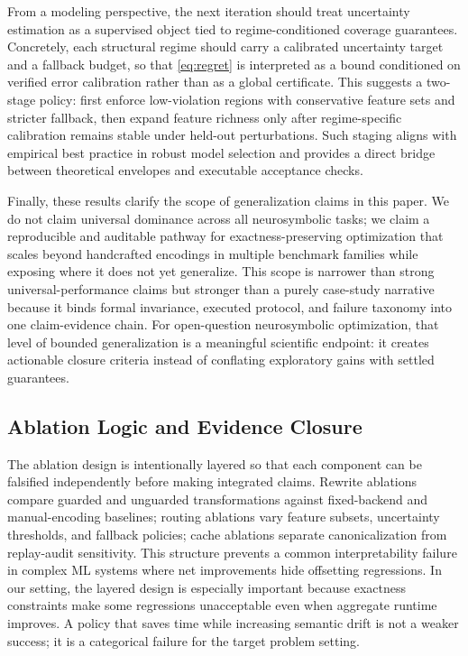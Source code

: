 \documentclass{article} %
\begin{document}
From a modeling perspective, the next iteration should treat uncertainty estimation as a supervised object tied to regime-conditioned coverage guarantees. Concretely, each structural regime should carry a calibrated uncertainty target and a fallback budget, so that \eqref{eq:regret} is interpreted as a bound conditioned on verified error calibration rather than as a global certificate. This suggests a two-stage policy: first enforce low-violation regions with conservative feature sets and stricter fallback, then expand feature richness only after regime-specific calibration remains stable under held-out perturbations. Such staging aligns with empirical best practice in robust model selection and provides a direct bridge between theoretical envelopes and executable acceptance checks.

Finally, these results clarify the scope of generalization claims in this paper. We do not claim universal dominance across all neurosymbolic tasks; we claim a reproducible and auditable pathway for exactness-preserving optimization that scales beyond handcrafted encodings in multiple benchmark families while exposing where it does not yet generalize. This scope is narrower than strong universal-performance claims but stronger than a purely case-study narrative because it binds formal invariance, executed protocol, and failure taxonomy into one claim-evidence chain. For open-question neurosymbolic optimization, that level of bounded generalization is a meaningful scientific endpoint: it creates actionable closure criteria instead of conflating exploratory gains with settled guarantees.

\subsection{Ablation Logic and Evidence Closure}
The ablation design is intentionally layered so that each component can be falsified independently before making integrated claims. Rewrite ablations compare guarded and unguarded transformations against fixed-backend and manual-encoding baselines; routing ablations vary feature subsets, uncertainty thresholds, and fallback policies; cache ablations separate canonicalization from replay-audit sensitivity. This structure prevents a common interpretability failure in complex ML systems where net improvements hide offsetting regressions. In our setting, the layered design is especially important because exactness constraints make some regressions unacceptable even when aggregate runtime improves. A policy that saves time while increasing semantic drift is not a weaker success; it is a categorical failure for the target problem setting.
\end{document}
